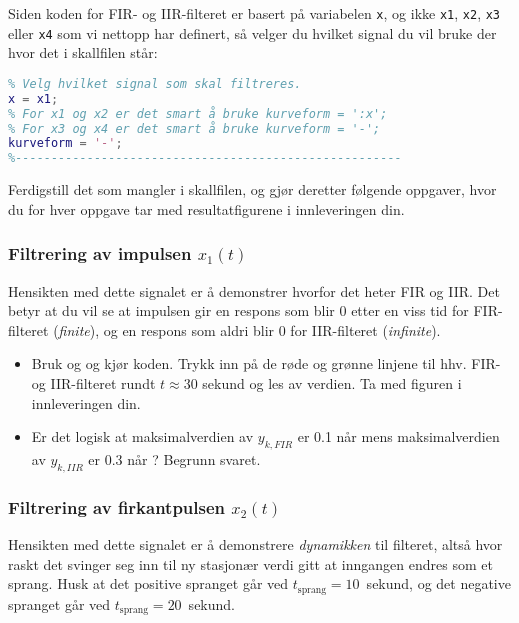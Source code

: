   Siden koden for FIR- og IIR-filteret er basert på variabelen {\tt x}, 
  og ikke {\tt x1}, {\tt x2}, {\tt x3} eller {\tt x4} som vi nettopp
  har definert, så velger du  hvilket signal du vil bruke der
  hvor det i skallfilen står:
  
\begin{lstlisting}[caption={Syntaks for å velge hvilket signal som
    skal filtreres.},  language= Matlab,   label=kode:velg,
numbers=none] 
%------------------------------------------------------
% Velg hvilket signal som skal filtreres. 
x = x1;
% For x1 og x2 er det smart å bruke kurveform = ':x';
% For x3 og x4 er det smart å bruke kurveform = '-';
kurveform = '-';
%------------------------------------------------------
\end{lstlisting}

  
Ferdigstill det som mangler i skallfilen, og gjør deretter følgende
oppgaver, hvor du for hver oppgave tar med resultatfigurene i innleveringen din.

\subsubsection*{\bf Filtrering av impulsen $x_{1}(t)$}

  Hensikten med dette signalet er
  å demonstrer hvorfor det heter FIR og IIR. Det betyr at du vil se at
  impulsen gir en  respons som blir 0 etter en viss tid for
  FIR-filteret ({\it finite}),  og en respons som aldri blir 0 for
  IIR-filteret ({\it infinite}). 

  \begin{itemize}
  \item Bruk   og   og kjør
    koden. Trykk inn på
    de røde og grønne linjene til hhv. FIR- og IIR-filteret rundt
    $t{\approx}30$ sekund og les av verdien. Ta med figuren i
    innleveringen din. 
  \item Er det logisk at maksimalverdien av  $y_{k,FIR}$  er 0.1 
    når   mens maksimalverdien av   $y_{k,IIR}$ er 0.3 når
    ? Begrunn svaret.
  \end{itemize}

\subsubsection*{\bf Filtrering av firkantpulsen $x_{2}(t)$}

  Hensikten med dette signalet er å
  demonstrere {\it dynamikken} til filteret, altså hvor raskt det
  svinger seg inn til ny stasjonær verdi gitt at inngangen endres som
  et sprang. Husk at det positive spranget går ved
  $t_{\text{sprang}}{=}10$~sekund, og det negative spranget går ved
  $t_{\text{sprang}}{=}20$~sekund.
  
